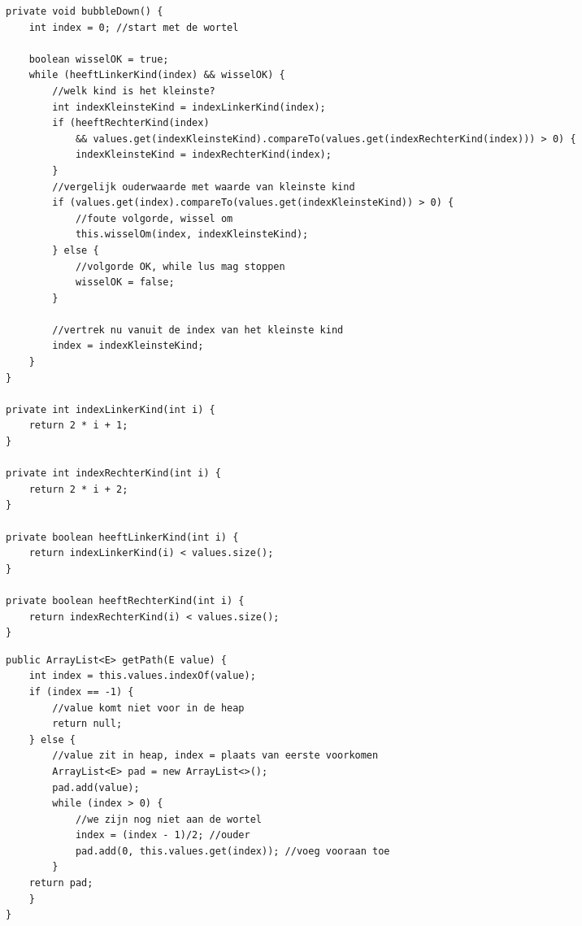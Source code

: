 \begin{Oplossing}{5.5}
\begin{lstlisting}[caption={bubbleDown methode}, label=minheapbubbleDown]
private void bubbleDown() {
	int index = 0; //start met de wortel
		
	boolean wisselOK = true;
	while (heeftLinkerKind(index) && wisselOK) {
		//welk kind is het kleinste?
		int indexKleinsteKind = indexLinkerKind(index);
		if (heeftRechterKind(index)
			&& values.get(indexKleinsteKind).compareTo(values.get(indexRechterKind(index))) > 0) {
			indexKleinsteKind = indexRechterKind(index);
		}
		//vergelijk ouderwaarde met waarde van kleinste kind
		if (values.get(index).compareTo(values.get(indexKleinsteKind)) > 0) {
			//foute volgorde, wissel om				
			this.wisselOm(index, indexKleinsteKind);
		} else {
			//volgorde OK, while lus mag stoppen
			wisselOK = false;
		}
			
		//vertrek nu vanuit de index van het kleinste kind
		index = indexKleinsteKind;
	}
}

private int indexLinkerKind(int i) {
	return 2 * i + 1;
}
	
private int indexRechterKind(int i) {
	return 2 * i + 2;
}
	
private boolean heeftLinkerKind(int i) {
	return indexLinkerKind(i) < values.size();
}
	
private boolean heeftRechterKind(int i) {
	return indexRechterKind(i) < values.size();
}
\end{lstlisting}

\end{Oplossing}
\begin{Oplossing}{5.6}
\begin{lstlisting}[caption={getPath methode}, label=minheapgetPath]
public ArrayList<E> getPath(E value) {
	int index = this.values.indexOf(value);
	if (index == -1) {
		//value komt niet voor in de heap
		return null;
	} else {
		//value zit in heap, index = plaats van eerste voorkomen
		ArrayList<E> pad = new ArrayList<>();
		pad.add(value);
		while (index > 0) {
			//we zijn nog niet aan de wortel
			index = (index - 1)/2; //ouder
			pad.add(0, this.values.get(index)); //voeg vooraan toe
		}
	return pad;	
	}
}
\end{lstlisting}
\end{Oplossing}
